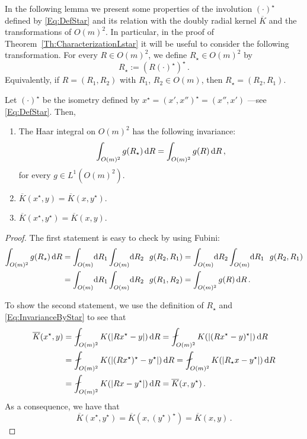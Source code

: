 In the following lemma we present some properties of the involution $(\cdot)^\star$ defined by \eqref{Eq:DefStar} and its relation with the doubly radial kernel $\overline{K}$ and the transformations of $O(m)^2$. In particular, in the proof of Theorem~\ref{Th:CharacterizationLstar} it will be useful to consider the following transformation. For every $R\in O(m)^2$, we define  $R_\star\in O(m)^2$ by 
\begin{equation}
	\label{Eq:DefRStar}
	R_\star := (R(\cdot)^\star)^\star\,.
\end{equation}
Equivalently, if $R = (R_1, R_2)$ with $R_1$, $R_2 \in O(m)$, then $R_\star = (R_2, R_1)$.

\begin{lemma}
\label{Lemma:PropertiesStar}
Let $(\cdot)^\star$ be the isometry defined by $x^\star = (x',x'')^\star = (x'', x')$
---see \eqref{Eq:DefStar}.
Then,
\begin{enumerate}
\item
The Haar integral on $O(m)^2$ has the following invariance:
\begin{equation}
\label{Eq:InvarianceByStar}
\int_{O(m)^2} g(R_\star) \,\mathrm{d} R = \int_{O(m)^2} g(R) \,\mathrm{d} R \,,
\end{equation}
for every $g \in L^1(O(m)^2)$.
\item $\overline{K}(x^\star,y) = \overline{K} (x,y^\star)$.
\item $\overline{K}(x^\star,y^\star) = \overline{K} (x,y)$.
\end{enumerate}
\end{lemma}

\begin{proof}
The first statement is easy to check by using Fubini:
\begin{align*}
\int_{O(m)^2} g(R_\star) \d R & = \int_{O(m)} \!\! \d R_1 \int_{O(m)} \!\! \d R_2 \ \ g(R_2, R_1)  =  \int_{O(m)} \!\! \d R_2 \int_{O(m)} \!\! \d R_1 \ \ g(R_2, R_1) \\
& =  \int_{O(m)} \!\! \d R_1 \int_{O(m)} \!\! \d R_2 \ \ g(R_1, R_2)  =  \int_{O(m)^2} g(R) \d R\,.
\end{align*}

To show the second statement, we use the definition of $R_\star$ and \eqref{Eq:InvarianceByStar}
to see that
\begin{align*}
\overline{K}(x^\star,y) &= \average_{O(m)^2} K(|Rx^\star - y|) \d R = \average_{O(m)^2} K(|(Rx^\star - y)^\star|) \d R \\
&= \average_{O(m)^2} K(|(R x^\star)^\star - y^\star|) \d R = \average_{O(m)^2} K(|R_\star x - y^\star|) \d R \\
&= \average_{O(m)^2} K(|Rx - y^\star|) \d R = \overline{K}(x,y^\star)\,.
\end{align*}
As a consequence, we have that
$$\overline{K}(x^\star,y^\star) = \overline{K}(x,(y^\star)^\star) = \overline{K}(x,y)\,.$$
\end{proof}


